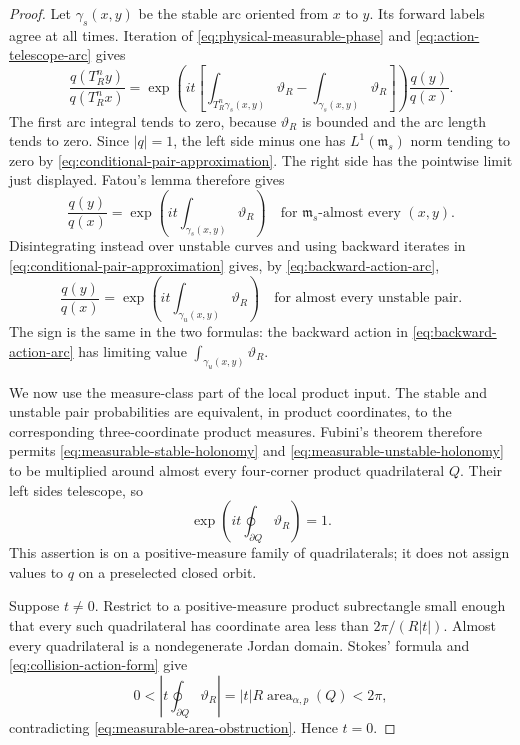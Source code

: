 \begin{proof}
Let $\gamma_s(x,y)$ be the stable arc oriented from $x$ to $y$.
Its forward labels agree at all times. Iteration of
\eqref{eq:physical-measurable-phase} and
\eqref{eq:action-telescope-arc} gives
\[
 \frac{q(T_R^ny)}{q(T_R^nx)}
 =\exp\!\left(it\left[\int_{T_R^n\gamma_s(x,y)}\vartheta_R
                         -\int_{\gamma_s(x,y)}\vartheta_R\right]\right)
                         \frac{q(y)}{q(x)}.
\]
The first arc integral tends to zero, because $\vartheta_R$ is bounded
and the arc length tends to zero. Since $|q|=1$, the left side minus one
has $L^1(\mathfrak m_s)$ norm tending to zero by
\eqref{eq:conditional-pair-approximation}. The right side has the
pointwise limit just displayed. Fatou's lemma therefore gives
\begin{equation}\label{eq:measurable-stable-holonomy}
 \frac{q(y)}{q(x)}
       =\exp\!\left(it\int_{\gamma_s(x,y)}\vartheta_R\right)
       \quad\text{for }\mathfrak m_s\text{-almost every }(x,y).
\end{equation}
Disintegrating instead over unstable curves and using backward iterates
in \eqref{eq:conditional-pair-approximation} gives, by
\eqref{eq:backward-action-arc},
\begin{equation}\label{eq:measurable-unstable-holonomy}
 \frac{q(y)}{q(x)}
       =\exp\!\left(it\int_{\gamma_u(x,y)}\vartheta_R\right)
       \quad\text{for almost every unstable pair}.
\end{equation}
The sign is the same in the two formulas: the backward action in
\eqref{eq:backward-action-arc} has limiting value
$\int_{\gamma_u(x,y)}\vartheta_R$.

We now use the measure-class part of the local product input. The stable
and unstable pair probabilities are equivalent, in product coordinates,
to the corresponding three-coordinate product measures. Fubini's theorem
therefore permits \eqref{eq:measurable-stable-holonomy} and
\eqref{eq:measurable-unstable-holonomy} to be multiplied around almost
every four-corner product quadrilateral $Q$. Their left sides telescope,
so
\begin{equation}\label{eq:measurable-area-obstruction}
 \exp\!\left(it\oint_{\partial Q}\vartheta_R\right)=1.
\end{equation}
This assertion is on a positive-measure family of quadrilaterals; it does
not assign values to $q$ on a preselected closed orbit.

Suppose $t\ne0$. Restrict to a positive-measure product subrectangle
small enough that every such quadrilateral has coordinate area less
than $2\pi/(R|t|)$. Almost every quadrilateral is a nondegenerate Jordan
domain. Stokes' formula and \eqref{eq:collision-action-form} give
\[
 0<\left|t\oint_{\partial Q}\vartheta_R\right|
       =|t|R\operatorname{area}_{\alpha,p}(Q)<2\pi,
\]
contradicting \eqref{eq:measurable-area-obstruction}. Hence $t=0$.
\end{proof}

